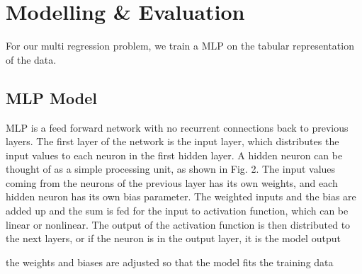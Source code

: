 \documentclass{report} %
\begin{document}
\chapter{Modelling \& Evaluation}

For our multi regression problem, we train a \ac{MLP} on the tabular representation of the data.

\section{\ac{MLP} Model}\label{sec:MLP Model}

\ac{MLP} is a feed forward network with no recurrent connections back to previous layers.
The first layer of the network is the input layer, which distributes the input values to each neuron in the first hidden
layer. A hidden neuron can be thought of as a simple processing unit, as shown in Fig. 2. The input values coming from the neurons of the previous layer has its own weights, and
each hidden neuron has its own bias parameter. The weighted inputs and the bias are added up and the sum is fed for the input to activation function, which can be linear or nonlinear.
The output of the activation function is then distributed to the next layers, or if the neuron is in the output layer, it is the model output

the weights and biases are adjusted so that the model fits the training data
\end{document}
